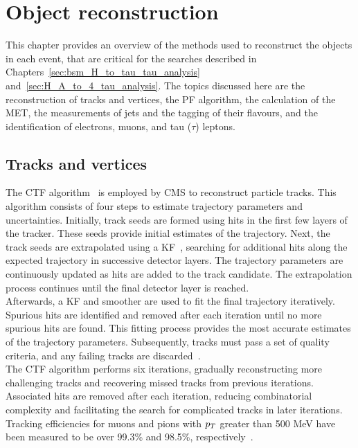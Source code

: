 \chapter{Object reconstruction}
\label{sec:object_reconstruction}

This chapter provides an overview of the methods used to reconstruct the objects in each event, that are critical for the searches described in Chapters~\ref{sec:bsm_H_to_tau_tau_analysis} and~\ref{sec:H_A_to_4_tau_analysis}.
The topics discussed here are the reconstruction of tracks and vertices, the \ac{PF} algorithm, the calculation of the \ac{MET}, the measurements of jets and the tagging of their flavours, and the identification of electrons, muons, and tau ($\tau$) leptons.

\section{Tracks and vertices}
\label{sec:track_and_vertex}

The \ac{CTF} algorithm~\cite{CMS:2014pgm} is employed by \ac{CMS} to reconstruct particle tracks. 
This algorithm consists of four steps to estimate trajectory parameters and uncertainties. 
Initially, track seeds are formed using hits in the first few layers of the tracker. 
These seeds provide initial estimates of the trajectory. 
Next, the track seeds are extrapolated using a \ac{KF}~\cite{Fruhwirth:1987fm}, searching for additional hits along the expected trajectory in successive detector layers. 
The trajectory parameters are continuously updated as hits are added to the track candidate. 
The extrapolation process continues until the final detector layer is reached. \\

Afterwards, a \ac{KF} and smoother are used to fit the final trajectory iteratively. 
Spurious hits are identified and removed after each iteration until no more spurious hits are found. 
This fitting process provides the most accurate estimates of the trajectory parameters. 
Subsequently, tracks must pass a set of quality criteria, and any failing tracks are discarded~\cite{Fruhwirth:1987fm}. \\

The \ac{CTF} algorithm performs six iterations, gradually reconstructing more challenging tracks and recovering missed tracks from previous iterations. 
Associated hits are removed after each iteration, reducing combinatorial complexity and facilitating the search for complicated tracks in later iterations. 
Tracking efficiencies for muons and pions with $p_{T}$ greater than 500 MeV have been measured to be over 99.3\% and 98.5\%, respectively~\cite{CMS:2010mua}. \\

